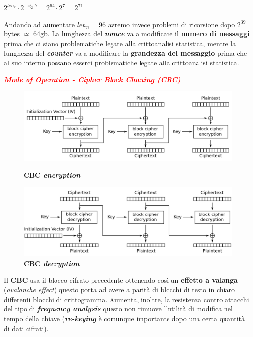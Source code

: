 \begin{flushleft}
    {\centering
        $2^{len_c} \cdot 2^{\log_2 b} = 2^{64} \cdot 2^7 = 2^{71}$
    \par}

    Andando ad aumentare $len_n = 96$ avremo invece problemi di ricorsione dopo $2^{39}$ bytes $\simeq$ 64gb. La lunghezza del \textbf{\textit{nonce}} va a modificare il \textbf{numero di messaggi} prima che ci siano problematiche legate alla crittoanalisi statistica, mentre la lunghezza del \textbf{\textit{counter}} va a modificare la \textbf{grandezza del messaggio} prima che al suo interno possano esserci problematiche legate alla crittoanalisi statistica.

    \textcolor{red}{\textbf{\textit{Mode of Operation - Cipher Block Chaning (CBC)}}}


    \begin{figure}[h]
        \centering
        \begin{minipage}[t]{0.45\textwidth}
            \centering
            \includegraphics[width=\textwidth]{img/cbc_enc.png}
            \caption{\textbf{CBC \textit{encryption}}}
        \end{minipage}
        \begin{minipage}[t]{0.45\textwidth}
            \centering
            \includegraphics[width=\textwidth]{img/cbc_dec.png}
            \caption{\textbf{CBC \textit{decryption}}}
        \end{minipage}
    \end{figure}
    Il \textbf{CBC} usa il blocco cifrato precedente ottenendo così un \textbf{effetto a valanga} (\textit{avalanche effect}) questo porta ad avere a parità di blocchi di testo in chiaro differenti blocchi di crittogramma. Aumenta, inoltre, la resistenza contro attacchi del tipo di \textbf{\textit{frequency analysis}} questo non rimuove l'utilità di modifica nel tempo della chiave (\textbf{\textit{re-keying}} è comunque importante dopo una certa quantità di dati cifrati).


\end{flushleft}
